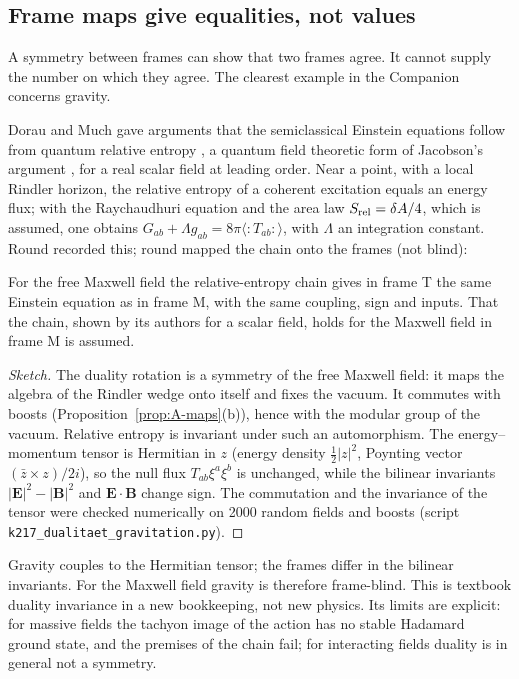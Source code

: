 \subsection{Frame maps give equalities, not values}
\label{sec:A-equalities}

A symmetry between frames can show that two frames agree. It cannot supply the number on which they
agree. The clearest example in the Companion concerns gravity.

Dorau and Much gave arguments that the semiclassical Einstein equations follow from quantum relative entropy
\cite{A-DorauMuch2026}, a quantum field theoretic form of Jacobson's argument
\cite{A-Jacobson1995}, for a real scalar field at leading order. Near a point, with a local Rindler horizon, the relative entropy of a coherent
excitation equals an energy flux; with the Raychaudhuri equation and the area law $S_{\rm rel}=\delta A/4$,
which is assumed, one obtains $G_{ab}+\Lambda g_{ab}=8\pi\langle{:}T_{ab}{:}\rangle$, with $\Lambda$ an
integration constant. Round  recorded this; round  mapped the chain onto the frames
\Exploration{} (not blind):

\begin{proposition}
\label{prop:A-frameblind}
For the free Maxwell field the relative-entropy chain gives in frame T the same Einstein equation as in
frame M, with the same coupling, sign and inputs. That the chain, shown by its authors for a scalar field, holds for the Maxwell
field in frame M is assumed.
\end{proposition}

\begin{proof}[Sketch]
The duality rotation is a symmetry of the free Maxwell field: it maps the algebra of the Rindler wedge
onto itself and fixes the vacuum. It commutes with boosts (Proposition~\ref{prop:A-maps}(b)), hence with
the modular group of the vacuum. Relative entropy is invariant under such an automorphism. The
energy--momentum tensor is Hermitian in $z$ (energy density $\tfrac12|z|^2$, Poynting vector
$(\bar z\times z)/2i$), so the null flux $T_{ab}\xi^a\xi^b$ is unchanged, while the bilinear invariants
$|\mathbf E|^2-|\mathbf B|^2$ and $\mathbf E\cdot\mathbf B$ change sign. The commutation and the invariance of
the tensor were checked numerically on 2000 random fields and boosts (script
\texttt{k217\_dualitaet\_gravitation.py}).
\end{proof}

Gravity couples to the Hermitian tensor; the frames differ in the bilinear invariants. For the Maxwell
field gravity is therefore frame-blind. This is textbook duality invariance in a new bookkeeping, not
new physics. Its limits are explicit: for massive fields the tachyon image of the action has no stable
Hadamard ground state, and the premises of the chain fail; for interacting fields duality is in general
not a symmetry.

